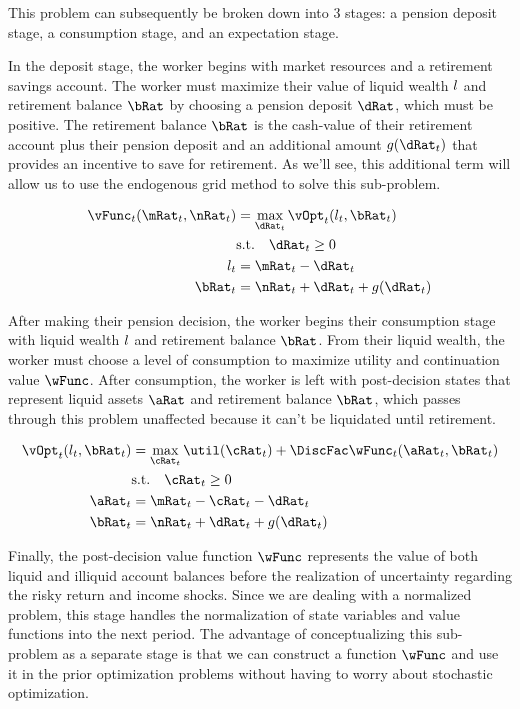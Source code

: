 \documentclass[\econtexRoot/SequentialEGM]{subfiles}
\begin{document}
This problem can subsequently be broken down into 3 stages: a pension deposit stage, a consumption stage, and an expectation stage.

In the deposit stage, the worker begins with market resources and a retirement savings account. The worker must maximize their value of liquid wealth $l$ and retirement balance $\bRat$ by choosing a pension deposit $\dRat$, which must be positive. The retirement balance $\bRat$ is the cash-value of their retirement account plus their pension deposit and an additional amount $g(\dRat_{t})$ that provides an incentive to save for retirement. As we'll see, this additional term will allow us to use the endogenous grid method to solve this sub-problem.

\begin{equation}
  \begin{split}
    \vFunc_{t}(\mRat_{t}, \nRat_{t}) & = \max_{\dRat_{t}} \vOpt_{t}(\lRat_{t}, \bRat_{t}) \\
    & \text{s.t.}  \quad \dRat_{t} \ge 0 \\
    \lRat_{t} & = \mRat_{t} - \dRat_{t} \\
    \bRat_{t} & = \nRat_{t} + \dRat_{t} + g(\dRat_{t})
  \end{split}
\end{equation}

After making their pension decision, the worker begins their consumption stage with liquid wealth $l$ and retirement balance $\bRat$. From their liquid wealth, the worker must choose a level of consumption to maximize utility and continuation value $\wFunc$. After consumption, the worker is left with post-decision states that represent liquid assets $\aRat$ and retirement balance $\bRat$, which passes through this problem unaffected because it can't be liquidated until retirement.

\begin{equation}
  \begin{split}
    \vOpt_{t}(\lRat_{t}, \bRat_{t}) & = \max_{\cRat_{t}} \util(\cRat_{t}) + \DiscFac \wFunc_{t}(\aRat_{t}, \bRat_{t})  \\
    & \text{s.t.} \quad \cRat_{t} \ge 0 \\
    \aRat_{t} & = \mRat_{t} - \cRat_{t} - \dRat_{t} \\
    \bRat_{t} & = \nRat_{t} + \dRat_{t} + g(\dRat_{t})
  \end{split}
\end{equation}

Finally, the post-decision value function $\wFunc$ represents the value of both liquid and illiquid account balances before the realization of uncertainty regarding the risky return and income shocks. Since we are dealing with a normalized problem, this stage handles the normalization of state variables and value functions into the next period. The advantage of conceptualizing this sub-problem as a separate stage is that we can construct a function $\wFunc$ and use it in the prior optimization problems without having to worry about stochastic optimization.
\end{document}

